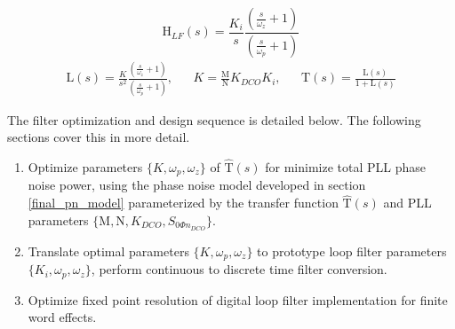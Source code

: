 	\begin{equation}\label{eq:loop_filter_def}
	\mathrm{H}_{LF}(s) = \frac{K_i}{s}\frac{(\frac{s}{\omega_z}+1)}{(\frac{s}{\omega_p}+1)}
	\end{equation}
	\begin{align}\label{eq:pll_tf_def}
	\mathrm{L}(s) = \frac{K}{s^2}\frac{(\frac{s}{\omega_z}+1)}{(\frac{s}{\omega_p}+1)},
	&&K=\frac{\mathrm{M}}{\mathrm{N}}K_{DCO}K_i,
	&&\mathrm{\hat{T}}(s) = \frac{\mathrm{L}(s)}{1+\mathrm{L}(s)}
	\end{align}

The filter optimization and design sequence is detailed below. The following sections cover this in more detail. 

\begin{enumerate}[itemsep=0pt,label=\protect\mycirc{\arabic*}]
	\setlength\itemsep{-0.8em}
	\item Optimize parameters $\{K, \omega_p, \omega_z\}$ of $\mathrm{\hat{T}}(s)$ for minimize total PLL phase noise power, using the phase noise model developed in section \ref{final_pn_model} parameterized by the transfer function $\mathrm{\hat{T}}(s)$ and PLL parameters $\{\mathrm{M},\mathrm{N},K_{DCO},S_{0\Phi n_{DCO}}\}$.
	\item Translate optimal parameters $\{K, \omega_p, \omega_z\}$ to prototype loop filter parameters $\{K_i, \omega_p, \omega_z\}$, perform continuous to discrete time filter conversion.
	\item Optimize fixed point resolution of digital loop filter implementation for finite word effects.
\end{enumerate}

